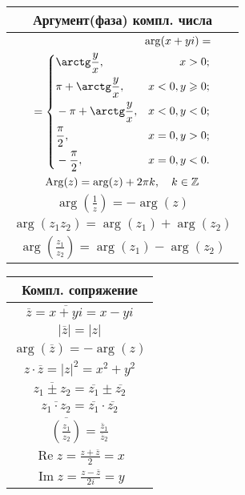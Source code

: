 \begin{tabu}[t]{||c||}
	\hline
		\textbf{Аргумент(фаза) компл. числа} \\
	\hline
	\hline
		$\displaystyle 
		\begin{aligned}
		\arg(x+yi) = \\
		= \left\{
		\begin{aligned}
			& \arctg\frac{y}{x}, & x > 0; \\
			& \pi + \arctg\frac{y}{x}, & x < 0, y \geqslant 0; \\
			& -\pi + \arctg\frac{y}{x}, & x < 0, y < 0; \\
			& \frac{\pi}{2}, & x = 0, y > 0; \\
			& -\frac{\pi}{2}, & x = 0, y < 0. \\
		\end{aligned}
		\right. \\
		\end{aligned} $ \\
	\hline
		$\displaystyle \operatorname{Arg}(z) = \arg(z) + 2\pi k, \quad k \in \mathbb{Z} $ \\
	\hline
		$\displaystyle \arg\left(\frac{1}{z}\right) = -\arg(z) $ \\
	\hline
		$\displaystyle \arg(z_1 z_2) = \arg(z_1) + \arg(z_2) $ \\
	\hline
		$\displaystyle \arg\left(\frac{z_1}{z_2}\right) = \arg(z_1) - \arg(z_2) $ \\
	\hline
\end{tabu}

\begin{tabu}[t]{||c||}
	\hline
		\textbf{Компл. сопряжение} \\
	\hline
	\hline
		$\displaystyle \overline{z} = \overline{x + yi} = x - yi $ \\
	\hline
		$\displaystyle |\overline{z}| = |z| $ \\
	\hline
		$\displaystyle \arg(\overline z) = -\arg(z) $ \\
	\hline
		$\displaystyle z\cdot\overline{z} = |z|^2 = x^2 + y^2 $ \\
	\hline
		$\displaystyle \overline{z_1 \pm z_2} = \overline{z_1} \pm \overline{z_2} $ \\
	\hline
		$\displaystyle \overline{z_1\cdot z_2} = \overline{z_1}\cdot\overline{z_2} $ \\
	\hline
		$\displaystyle \overline{\left(\frac{z_1}{z_2}\right)} = \frac{\overline z_1}{\overline z_2} $ \\
	\hline
		$\displaystyle \mathop{\text{Re}} z = \frac{z + \overline{z}}{2} = x $ \\
	\hline
		$\displaystyle \mathop{\text{Im}} z = \frac{z - \overline{z}}{2i} = y $ \\
	\hline
\end{tabu}

